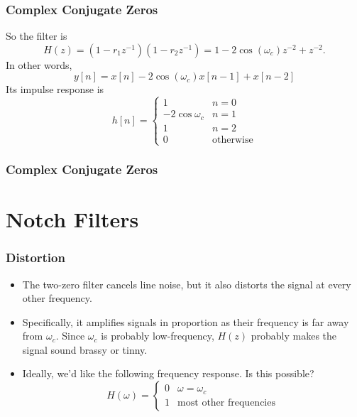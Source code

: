 \documentclass{beamer}
\begin{document}
\begin{frame}
  \frametitle{Complex Conjugate Zeros}
  
  So the filter is 
  \begin{displaymath}
    H(z) = (1-r_1z^{-1})(1-r_2z^{-1}) = 1-2\cos(\omega_c) z^{-2} + z^{-2}.
  \end{displaymath}
  In other words,
  \begin{displaymath}
    y[n] = x[n] - 2\cos(\omega_c)x[n-1] + x[n-2]
  \end{displaymath}
  Its impulse response is
  \begin{displaymath}
    h[n]=\begin{cases}
    1 & n=0\\
    -2\cos\omega_c & n=1\\
    1 & n=2\\
    0 & \mbox{otherwise}
    \end{cases}
  \end{displaymath}
\end{frame}

\begin{frame}
  \frametitle{Complex Conjugate Zeros}
  \centerline{}
\end{frame}  

\section[Notch Filters]{Notch Filters}
\setcounter{subsection}{1}

\begin{frame}
  \frametitle{Distortion}

  \begin{itemize}
    \item The two-zero filter cancels line noise, but it also distorts the
      signal at every other frequency.
    \item Specifically, it amplifies signals in proportion as their
      frequency is far away from $\omega_c$.  Since $\omega_c$ is probably
      low-frequency, $H(z)$ probably makes the signal sound brassy or tinny.
    \item Ideally, we'd like the following frequency response.  Is this possible?
      \begin{displaymath}
        H(\omega) = \begin{cases}
          0 & \omega=\omega_c \\
          1 & \mbox{most other frequencies}
        \end{cases}
      \end{displaymath}
  \end{itemize}
\end{frame}
\end{document}
